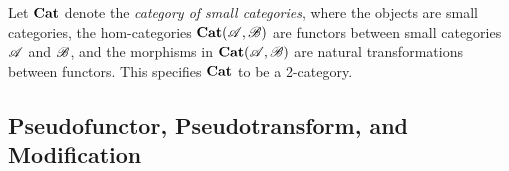 \documentclass{article}
\begin{document}
\begin{exmp}\label{exmp_cat_of_cat}
    Let $\mathbf{Cat}$ denote the \emph{category of small categories}, where the objects are small categories, the hom-categories $\mathbf{Cat}(\mathscr{A},\mathscr{B})$ are functors between small categories $\mathscr{A}$ and $\mathscr{B}$, and the morphisms in $\mathbf{Cat}(\mathscr{A},\mathscr{B})$ are natural transformations between functors. This specifies $\mathbf{Cat}$ to be a 2-category. 
    
\end{exmp}

\hfil

\subsection{Pseudofunctor, Pseudotransform, and Modification}\label{sub_pseudos}
\end{document}
